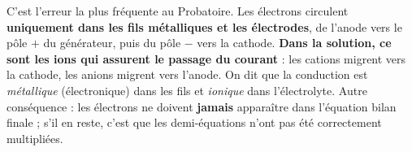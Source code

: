\documentclass[11pt]{article}
\begin{document}
\begin{attention}
C'est l'erreur la plus fréquente au Probatoire. Les électrons circulent \textbf{uniquement dans les fils métalliques et les électrodes}, de l'anode vers le pôle $+$ du générateur, puis du pôle $-$ vers la cathode. \textbf{Dans la solution, ce sont les ions qui assurent le passage du courant} : les cations migrent vers la cathode, les anions migrent vers l'anode. On dit que la conduction est \emph{métallique} (électronique) dans les fils et \emph{ionique} dans l'électrolyte. Autre conséquence : les électrons ne doivent \textbf{jamais} apparaître dans l'équation bilan finale ; s'il en reste, c'est que les demi-équations n'ont pas été correctement multipliées.
\end{attention}
\end{document}
